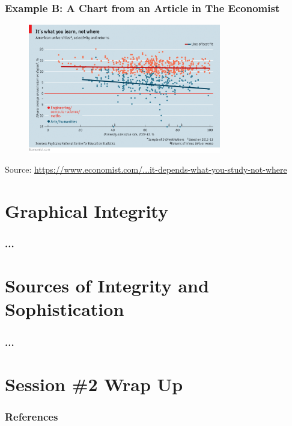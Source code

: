 \documentclass[notes, aspectratio=1610]{beamer}
\begin{document}
\begin{frame}
	\frametitle{Example B: A Chart from an Article in The Economist}
	\begin{figure}
		\begin{small}
			\begin{center}
				\includegraphics[width=0.75\textwidth]{images/economist_scatter.png}
			\end{center}
		\end{small}
	\end{figure}

	\footnotesize
	Source: \href{https://www.economist.com/united-states/2015/03/12/it-depends-what-you-study-not-where}
	{https://www.economist.com/...it-depends-what-you-study-not-where}
\end{frame}
\section{Graphical Integrity}

\begin{frame}
	\frametitle{...}
\end{frame}

\section{Sources of Integrity and Sophistication}

\begin{frame}
	\frametitle{...}
\end{frame}

\section{Session \#2 Wrap Up}


\begin{frame}
	\frametitle{References}
	\printbibliography
 \end{frame} 
\end{document}
